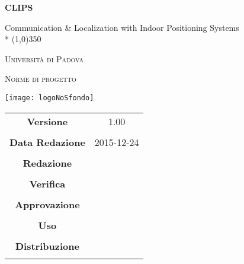 \documentclass[a4paper,12pt]{article}
\author{Oscar Elia Conti, Marco Zanella}
\date{24/12/2015}
\begin{document}
\pagestyle{myfront}
\begin{titlepage}
	\centering
	{\huge\bfseries CLIPS\par}
	Communication \& Localization with Indoor Positioning Systems \\*
	\line(1,0){350} \\
	{\scshape\LARGE Università di Padova \par}
	\vspace{1cm}
	{\scshape\Large Norme di progetto\par}
	\vspace{2cm}
	\begin{center}
	{\texttt{[image: logoNoSfondo]} \par}
	\end{center}
	\vfill \vfill
	\begin{tabular}{c|c}
		{\hfill \textbf{Versione}} 			& 1.00				\\ \\
		{\hfill\textbf{Data Redazione}} 		& 2015-12-24  		\\ \\
		{\hfill\textbf{Redazione}} 			&  \\ \\
		{\hfill\textbf{Verifica}} 				&  \\ \\
		{\hfill\textbf{Approvazione}} 		&  \\ \\
		{\hfill\textbf{Uso}} 					& \\ \\
		{\hfill\textbf{Distribuzione}} 			& \\ \\
	\end{tabular}
\end{titlepage}
	
	\newpage

	\tableofcontents
	
	\label{LastFrontPage}
	
		

	\newpage
	
	\pagestyle{mymain}
	
	\newpage
		

	\newpage
		
	
	\newpage
		
	
	\newpage
		
		
	\label{LastPage}
\end{document}
